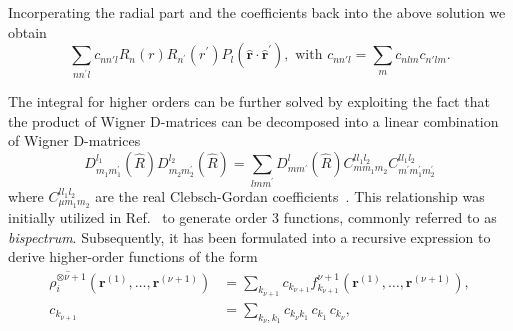 Incorperating the radial part and the coefficients back into the above solution we obtain
\begin{equation}
  \label{eq:soap}
  \sum_{nn^\prime l} c_{nn'l} R_n(r)R_{n^\prime}(r^\prime) P_l(\hat{\mathbf{r}}\cdot\hat{\mathbf{r}}^\prime),\textrm{ with }c_{nn'l} = \sum_{m} c_{nlm}c_{n'lm}.
\end{equation}

The integral for higher orders can be further solved by exploiting the fact that the product of Wigner D-matrices can be decomposed into a linear combination of Wigner D-matrices
\begin{equation}
  \label{eq:clebsch-gordan}
  D^{l_1}_{m_1m_1^\prime}(\hat{R})D^{l_2}_{m_2m_2^\prime}(\hat{R}) = \sum_{l m m^\prime} D^{l}_{mm^\prime}(\hat{R}) C^{l l_1l_2}_{mm_1m_2}C^{l l_1l_2}_{m^\prime m_1^\prime m_2^\prime}
\end{equation}
where $C^{l l_1l_2}_{\mu m_1m_2}$ are the real Clebsch-Gordan coefficients~\cite{yutsis1965theory,niga+20jcp}.
This relationship was initially utilized in Ref.~\cite{bart+13prb} to generate order 3 functions, commonly referred to as \emph{bispectrum}.
Subsequently, it has been formulated into a recursive expression to derive higher-order functions of the form
\begin{subequations}
\label{eq:recursive_higherorder}
\begin{align}
  \overline{\rho_i^{\otimes\nu+1}}(\mathbf{r}^{(1)}, \ldots, \mathbf{r}^{(\nu+1)}) &= \sum_{k_{\nu+1}} c_{k_{\nu+1}} f^{\nu+1}_{k_{\nu+1}}(\mathbf{r}^{(1)}, \ldots, \mathbf{r}^{(\nu+1)}), \\
  c_{k_{\nu+1}} &= \sum_{k_\nu, k_1} c_{k_\nu k_1}\, c_{k_1}\, c_{k_\nu},
\end{align}
\end{subequations}
